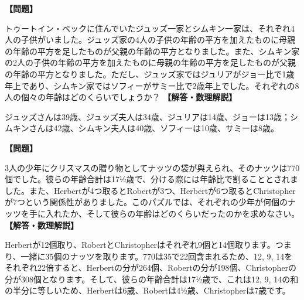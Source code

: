 \documentclass[10pt,a4paper,oneside,openany]{ltjsbook}
\begin{document}
\begin{tcolorbox}[colback=softblue,colframe=primaryblue,title=\textbf{第 49 問：隣人兄弟 （原題: NEXT-DOOR NEIGHBOURS.）},arc=2mm,boxrule=1pt,breakable]
\textbf{【問題】}\par\vspace{0.3em}
トゥートイン・ベックに住んでいたジュッズ一家とシムキン一家は、それぞれ4人の子供がいました。ジュッズ家の4人の子供の年齢の平方を加えたものに母親の年齢の平方を足したものが父親の年齢の平方となりました。また、シムキン家の2人の子供の年齢の平方を加えたものに母親の年齢の平方を足したものが父親の年齢の平方となりました。ただし、ジュッズ家ではジュリアがジョー比で1歳年上であり、シムキン家ではソフィーがサミー比で2歳年上でした。それぞれの8人の個々の年齢はどのくらいでしょうか？
\tcblower
\textbf{【解答・数理解説】}\par\vspace{0.3em}
ジュッズさんは39歳、ジュッズ夫人は34歳、ジュリアは14歳、ジョーは13歳；シムキンさんは42歳、シムキン夫人は40歳、ソフィーは10歳、サミーは8歳。
\end{tcolorbox}

\begin{tcolorbox}[colback=softblue,colframe=primaryblue,title=\textbf{第 50 問：ナッツの袋 （原題: THE BAG OF NUTS.）},arc=2mm,boxrule=1pt,breakable]
\textbf{【問題】}\par\vspace{0.3em}
3人の少年にクリスマスの贈り物としてナッツの袋が與えられ、そのナッツは770個でした。彼らの年齢合計は17½歳で、分ける際には年齢比で割ることとされました。また、Herbertが4つ取るとRobertが3つ、Herbertが6つ取るとChristopherが7つという関係性がありました。このパズルでは、それぞれの少年が何個のナッツを手に入れたか、そして彼らの年齢はどのくらいだったのかを求めなさい。
\tcblower
\textbf{【解答・数理解説】}\par\vspace{0.3em}
Herbertが12個取り、RobertとChristopherはそれぞれ9個と14個取ります。つまり、一緒に35個のナッツを取ります。770は35で22回含まれるため、12, 9, 14をそれぞれ22倍すると、Herbertの分が264個、Robertの分が198個、Christopherの分が308個となります。そして、彼らの年齢合計は17½歳で、これは12, 9, 14の和の半分に等しいため、Herbertは6歳、Robertは4½歳、Christopherは7歳です。
\end{tcolorbox}
\end{document}
